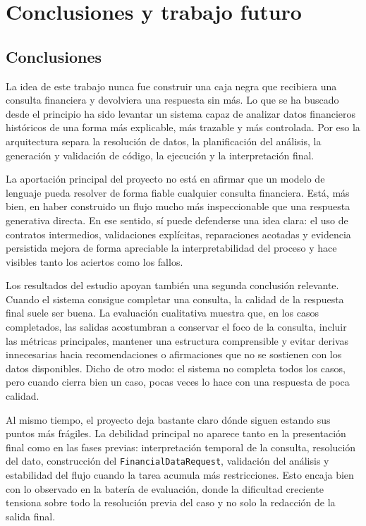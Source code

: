 \chapter{Conclusiones y trabajo futuro}

\section{Conclusiones}

La idea de este trabajo nunca fue construir una caja negra que recibiera una consulta financiera y devolviera una respuesta sin m\'as. Lo que se ha 
buscado desde el principio ha sido levantar un sistema capaz de analizar datos financieros hist\'oricos de una forma m\'as explicable, m\'as trazable y 
m\'as controlada. Por eso la arquitectura separa la resoluci\'on de datos, la planificaci\'on del an\'alisis, la generaci\'on y validaci\'on de c\'odigo, la 
ejecuci\'on y la interpretaci\'on final.

La aportaci\'on principal del proyecto no est\'a en afirmar que un modelo de lenguaje pueda resolver de forma fiable cualquier consulta financiera. Est\'a, 
m\'as bien, en haber construido un flujo mucho m\'as inspeccionable que una respuesta generativa directa. En ese sentido, s\'i puede defenderse una idea clara: 
el uso de contratos intermedios, validaciones expl\'icitas, reparaciones acotadas y evidencia persistida mejora de forma apreciable la interpretabilidad del 
proceso y hace visibles tanto los aciertos como los fallos.

Los resultados del estudio apoyan tambi\'en una segunda conclusi\'on relevante. Cuando el sistema consigue completar una consulta, la calidad de la respuesta 
final suele ser buena. La evaluaci\'on cualitativa muestra que, en los casos completados, las salidas acostumbran a conservar el foco de la consulta, incluir 
las m\'etricas principales, mantener una estructura comprensible y evitar derivas innecesarias hacia recomendaciones o afirmaciones que no se sostienen con los 
datos disponibles. Dicho de otro modo: el sistema no completa todos los casos, pero cuando cierra bien un caso, pocas veces lo hace con una respuesta de poca calidad.

Al mismo tiempo, el proyecto deja bastante claro d\'onde siguen estando sus puntos m\'as fr\'agiles. La debilidad principal no aparece tanto en la presentaci\'on 
final como en las fases previas: interpretaci\'on temporal de la consulta, resoluci\'on del dato, construcci\'on del \texttt{FinancialDataRequest}, validaci\'on 
del an\'alisis y estabilidad del flujo cuando la tarea acumula m\'as restricciones. Esto encaja bien con lo observado en la bater\'ia de evaluaci\'on, donde la 
dificultad creciente tensiona sobre todo la resoluci\'on previa del caso y no solo la redacci\'on de la salida final.

